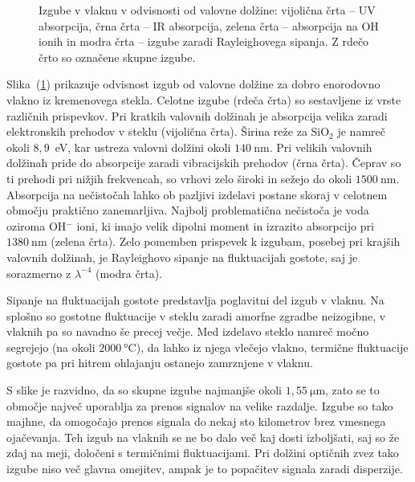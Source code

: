 \begin{figure}[h]
\centering
\def\svgwidth{90truemm} 
 
\caption{Izgube v vlaknu v odvisnosti od valovne dolžine: vijolična črta -- UV absorpcija, 
črna črta -- IR absorpcija, zelena črta -- absorpcija na OH ionih in modra črta --
izgube zaradi Rayleighovega sipanja. Z rdečo črto so označene skupne izgube.}
\label{FibAbs}
\end{figure}
Slika~(\ref{FibAbs}) prikazuje odvisnost izgub od valovne dolžine 
za dobro enorodovno vlakno iz kremenovega stekla. 
Celotne izgube (rdeča črta)
so sestavljene iz vrste različnih prispevkov. 
Pri kratkih valovnih dolžinah je absorpcija velika zaradi elektronskih prehodov
v steklu (vijolična črta). 
Širina reže za SiO$_2$ je namreč okoli $8,9$~eV, 
kar ustreza valovni dolžini
okoli $140~\si{\nano\meter}$. Pri velikih valovnih dolžinah pride do absorpcije zaradi
vibracijskih prehodov (črna črta). Čeprav so ti prehodi pri nižjih frekvencah, 
so vrhovi zelo široki in sežejo do okoli $1500~\si{\nano\meter}$. 
Absorpcija na nečistočah lahko ob pazljivi izdelavi postane skoraj v celotnem 
območju praktično zanemarljiva. 
Najbolj problematična nečistoča je voda oziroma OH$^{-}$ ioni, ki imajo velik dipolni
moment in izrazito absorpcijo pri $1380~\si{\nano\meter}$ (zelena črta). Zelo pomemben prispevek k 
izgubam, posebej pri krajših valovnih dolžinah, je Rayleighovo sipanje na fluktuacijah 
gostote, 
saj je sorazmerno z $\lambda^{-4}$ (modra črta). 

\begin{remark}
Sipanje na fluktuacijah gostote predstavlja poglavitni del izgub v vlaknu. Na splošno
so gostotne fluktuacije v steklu zaradi amorfne zgradbe neizogibne, v vlaknih
pa so navadno še precej večje. Med izdelavo steklo namreč močno segrejejo
(na okoli $2000~\si{\celsius}$), da lahko iz njega vlečejo vlakno, termične 
fluktuacije gostote pa pri hitrem ohlajanju ostanejo zamrznjene v vlaknu. 
\end{remark}

S slike je razvidno, da so skupne izgube najmanjše
okoli $1,55~\si{\micro\meter}$, zato se to območje največ uporablja za prenos signalov
na velike razdalje. Izgube so tako majhne, da omogočajo prenos signala 
do nekaj sto kilometrov brez vmesnega ojačevanja. Teh izgub na vlaknih se  
ne bo dalo več kaj dosti izboljšati, saj so že zdaj na meji,
določeni s termičnimi fluktuacijami. Pri dolžini optičnih zvez tako izgube niso več glavna
omejitev, ampak je to popačitev signala zaradi disperzije.

